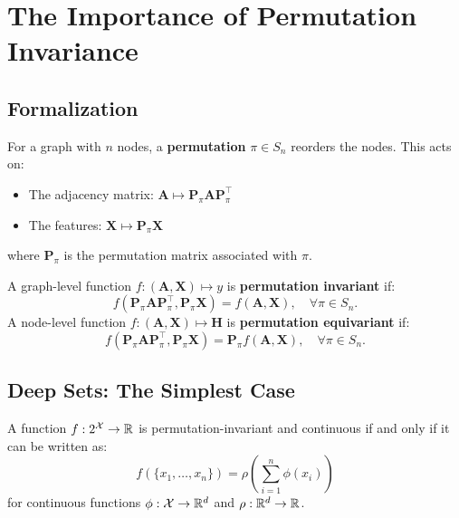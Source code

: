 \section{The Importance of Permutation Invariance}

\subsection{Formalization}

For a graph with $n$ nodes, a \textbf{permutation} $\pi \in S_n$ reorders
the nodes. This acts on:
\begin{itemize}
    \item The adjacency matrix: $\mathbf{A} \mapsto \mathbf{P}_\pi \mathbf{A} \mathbf{P}_\pi^\top$
    \item The features: $\mathbf{X} \mapsto \mathbf{P}_\pi \mathbf{X}$
\end{itemize}
where $\mathbf{P}_\pi$ is the permutation matrix associated with $\pi$.

\begin{definition}
A graph-level function $f: (\mathbf{A}, \mathbf{X}) \mapsto y$ is
\textbf{permutation invariant} if:
\[
    f(\mathbf{P}_\pi \mathbf{A} \mathbf{P}_\pi^\top, \mathbf{P}_\pi \mathbf{X})
    = f(\mathbf{A}, \mathbf{X}), \quad \forall \pi \in S_n.
\]
A node-level function $f: (\mathbf{A}, \mathbf{X}) \mapsto \mathbf{H}$ is
\textbf{permutation equivariant} if:
\[
    f(\mathbf{P}_\pi \mathbf{A} \mathbf{P}_\pi^\top, \mathbf{P}_\pi \mathbf{X})
    = \mathbf{P}_\pi f(\mathbf{A}, \mathbf{X}), \quad \forall \pi \in S_n.
\]
\end{definition}

\subsection{Deep Sets: The Simplest Case}

\begin{theorem}[Zaheer et al., 2017]
A function $f: 2^{\mathcal{X}} \to \mathbb{R}$ is permutation-invariant and continuous
if and only if it can be written as:
\[
    f(\{x_1, \ldots, x_n\}) = \rho\!\left(\sum_{i=1}^{n} \phi(x_i)\right)
\]
for continuous functions $\phi: \mathcal{X} \to \mathbb{R}^d$ and $\rho: \mathbb{R}^d \to \mathbb{R}$.
\end{theorem}

